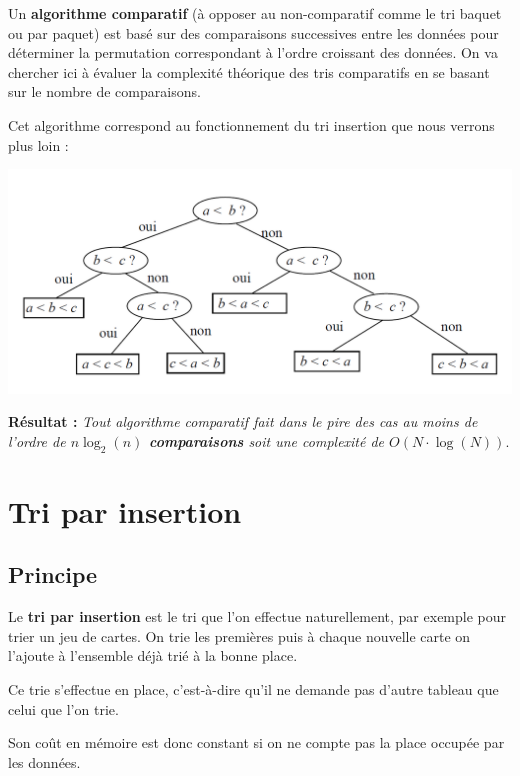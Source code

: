 \begin{exemple2}

Un \textbf{algorithme comparatif} (à opposer au non-comparatif comme le tri baquet ou par paquet) est basé sur des comparaisons successives entre les données pour déterminer la permutation correspondant à l'ordre croissant des données.
On va chercher ici à évaluer la complexité théorique des tris comparatifs en se basant sur le nombre de comparaisons.

Cet algorithme correspond au fonctionnement du tri insertion que nous verrons plus loin :

\begin{center}
\includegraphics[width=.6\textwidth]{images/C2.png}
\end{center}

\textbf{Résultat :}\textit{ Tout algorithme comparatif fait dans le pire des cas au moins de l'ordre de
\textbf{$n \log_2(n)$ comparaisons} soit une complexité de \textbf{$O(N\cdot \log(N))$}}.
\end{exemple2}

\section{Tri par insertion}
\subsection{Principe}

\begin{definition2}
Le \textbf{tri par insertion} est le tri que l'on effectue naturellement, par exemple pour trier un jeu de cartes. On trie les premières puis à chaque nouvelle carte on l'ajoute à l'ensemble déjà trié à la bonne place. 

Ce trie s'effectue en place, c'est-à-dire qu'il ne demande pas d'autre tableau que celui que l'on trie. 

Son coût en mémoire est donc constant si on ne compte pas la place occupée par les données.
\end{definition2}

